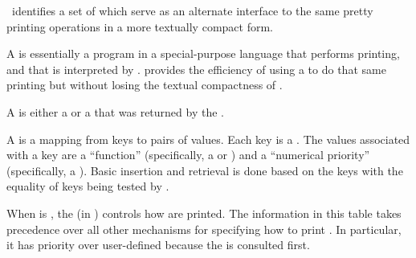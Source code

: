 \Thenextfigure\ identifies a set of  which serve
as an alternate interface to the same pretty printing operations in a 
more textually compact form.

 

\endsubsubsection%


A  is essentially a program in a special-purpose language
that performs printing, and that is interpreted by .
 provides the efficiency of using a  
to do that same printing but without losing the textual compactness of .

A  is either a  or a 
that was returned by the .

\endsubsubsection%

 

A  is a mapping from keys to pairs of values.  
Each key is a .  
The values associated with a key are
     a ``function'' (specifically, a  or \nil)
 and a ``numerical priority'' (specifically, a ).
Basic insertion and retrieval is done based on the keys with the equality
of keys being tested by .

When  is , 
the  (in )
controls how  are printed.
The information in this table takes precedence over
all other mechanisms for specifying how to print .
In particular, it 
has priority over
user-defined   
because the  is consulted first.

